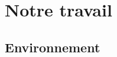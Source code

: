 \documentclass{llncs}
\begin{document}









\section{Notre travail}


\subsection{Environnement}
\end{document}
